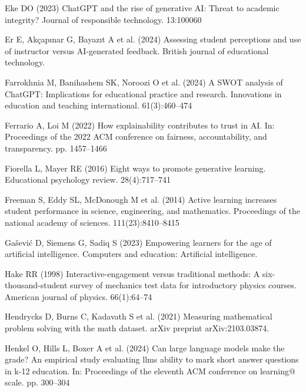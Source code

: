 \documentclass[
  12pt,
]{article}
\newlength{\cslhangindent}
\newenvironment{CSLReferences}[2] %
 {\begin{list}{}{%
  \setlength{\itemindent}{0pt}
  \setlength{\leftmargin}{0pt}
  \setlength{\parsep}{0pt}
  \ifodd #1
   \setlength{\leftmargin}{\cslhangindent}
   \setlength{\itemindent}{-1\cslhangindent}
  \fi
  \setlength{\itemsep}{#2\baselineskip}}}
 {\end{list}}
\begin{document}
\begin{CSLReferences}{1}{0}
Eke DO (2023) ChatGPT and the rise of generative AI: Threat to academic integrity? Journal of responsible technology. 13:100060

Er E, Akçapınar G, Bayazıt A et al. (2024) Assessing student perceptions and use of instructor versus AI-generated feedback. British journal of educational technology.

Farrokhnia M, Banihashem SK, Noroozi O et al. (2024) A SWOT analysis of ChatGPT: Implications for educational practice and research. Innovations in education and teaching international. 61(3):460--474

Ferrario A, Loi M (2022) How explainability contributes to trust in AI. In: Proceedings of the 2022 ACM conference on fairness, accountability, and transparency. pp. 1457--1466

Fiorella L, Mayer RE (2016) Eight ways to promote generative learning. Educational psychology review. 28(4):717--741

Freeman S, Eddy SL, McDonough M et al. (2014) Active learning increases student performance in science, engineering, and mathematics. Proceedings of the national academy of sciences. 111(23):8410--8415

Gašević D, Siemens G, Sadiq S (2023) Empowering learners for the age of artificial intelligence. Computers and education: Artificial intelligence.

Hake RR (1998) Interactive-engagement versus traditional methods: A six-thousand-student survey of mechanics test data for introductory physics courses. American journal of physics. 66(1):64--74

Hendrycks D, Burns C, Kadavath S et al. (2021) Measuring mathematical problem solving with the math dataset. arXiv preprint arXiv:2103.03874.

Henkel O, Hills L, Boxer A et al. (2024) Can large language models make the grade? An empirical study evaluating llms ability to mark short answer questions in k-12 education. In: Proceedings of the eleventh ACM conference on learning@ scale. pp. 300--304


\end{CSLReferences}
\end{document}
